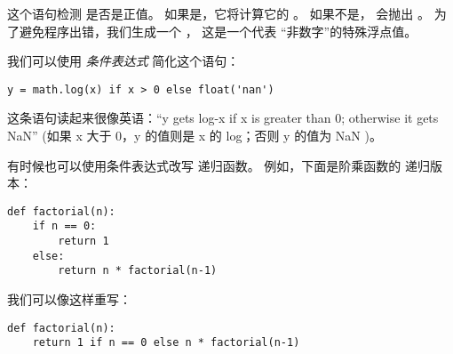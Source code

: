 
这个语句检测  是否是正值。
如果是，它将计算它的 。
如果不是，  会抛出 。
为了避免程序出错，我们生成一个 ， 这是一个代表 ``非数字''的特殊浮点值。



我们可以使用 {\em 条件表达式} 简化这个语句：

\begin{lstlisting}
y = math.log(x) if x > 0 else float('nan')
\end{lstlisting}


这条语句读起来很像英语：``y gets log-x if x is
greater than 0; otherwise it gets NaN''
(如果 x 大于 0，y 的值则是 x 的 log；否则 y 的值为 NaN )。


有时候也可以使用条件表达式改写 递归函数。  例如，下面是阶乘函数的 递归版本：


\begin{lstlisting}
def factorial(n):
    if n == 0:
        return 1
    else:
        return n * factorial(n-1)
\end{lstlisting}


我们可以像这样重写：

\begin{lstlisting}
def factorial(n):
    return 1 if n == 0 else n * factorial(n-1)
\end{lstlisting}



